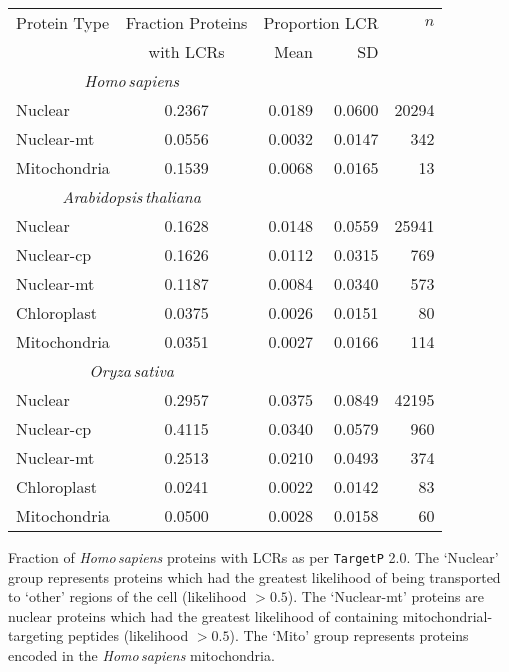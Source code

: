 \documentclass[a4paper,12pt]{article}
\newcommand{\arab}{\mbox{\textit{Arabidopsis\,thaliana}}\xspace}
\newcommand{\oryz}{\mbox{\textit{Oryza\,sativa}}\xspace}
\newcommand{\homo}{\mbox{\textit{Homo\,sapiens}}\xspace}
\newcommand{\tget}{\mbox{\texttt{TargetP}}\xspace}
\begin{document}
\begin{table*}[ht]
    \caption{Fraction of Proteins with LCRs using \tget subcellular localization}
    \label{tab:targetp}
    \centering
    \begin{tabular}{lcrrr}
        \toprule
        Protein Type & Fraction Proteins & \multicolumn{2}{c}{Proportion LCR} & $n$ \\
                     & with LCRs         & Mean & SD &      \\
        \midrule \multicolumn{2}{c}{\quad\quad\homo} &       & & \\
        Nuclear        & 0.2367 & 0.0189 & 0.0600 & 20294 \\
        Nuclear-mt        & 0.0556 & 0.0032 & 0.0147 & 342 \\
        Mitochondria   & 0.1539 & 0.0068 & 0.0165 & 13 \\
        \midrule \multicolumn{2}{c}{\quad\quad\arab} &      & & \\
        Nuclear        & 0.1628 & 0.0148 & 0.0559 & 25941 \\
        Nuclear-cp        & 0.1626 & 0.0112 & 0.0315 & 769 \\
        Nuclear-mt        & 0.1187 & 0.0084 & 0.0340 & 573 \\
        Chloroplast    & 0.0375 & 0.0026 & 0.0151 & 80 \\
        Mitochondria   & 0.0351 & 0.0027 & 0.0166 & 114 \\
        \midrule \multicolumn{2}{c}{\quad\quad\oryz} &     & & \\
        Nuclear        & 0.2957 & 0.0375 & 0.0849 & 42195 \\
        Nuclear-cp        & 0.4115 & 0.0340 & 0.0579 & 960 \\
        Nuclear-mt        & 0.2513 & 0.0210 & 0.0493 & 374 \\
        Chloroplast    & 0.0241 & 0.0022 & 0.0142 & 83 \\
        Mitochondria   & 0.0500 & 0.0028 & 0.0158 & 60 \\
        \bottomrule
    \end{tabular}
\end{table*}



\newcommand{\location}{homo_targetp_lcrproportions}
\newcommand{\nucNumber}{20294}
\newcommand{\nucMitoNumber}{342}
\newcommand{\mitoNumber}{13}
\begin{figure*}[ht]
    \caption{TargetP -- \homo}
    
    \centering\parbox{0.9\textwidth}{\footnotesize Fraction of \homo
    proteins with LCRs as per \tget 2.0.  The `Nuclear' group represents
    proteins which had the greatest likelihood of being transported
    to `other' regions of the cell (likelihood $>0.5$). The `Nuclear-mt'
    proteins are nuclear proteins which had the greatest likelihood of
    containing mitochondrial-targeting peptides (likelihood $>0.5$).  The
    `Mito' group represents proteins encoded in the \homo mitochondria.}
    \label{fig:histogramtargetphomo}
\end{figure*}
\end{document}
